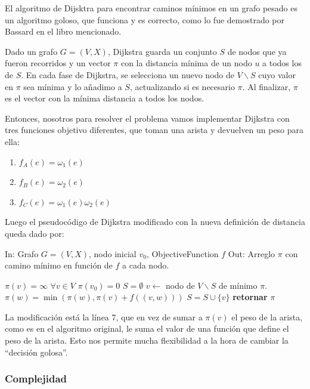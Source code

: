 El algoritmo de Dijsktra para encontrar caminos m\'inimos en un grafo pesado es un algoritmo goloso, que funciona y es correcto, como lo fue demostrado por Bassard en el libro mencionado.

Dado un grafo $G=(V,X)$, Dijkstra guarda un conjunto $S$ de nodos que ya fueron recorridos y un vector $\pi$ con la distancia m\'inima de un nodo $u$ a todos los de $S$. En cada fase de Dijkstra, se selecciona un nuevo nodo de $V\backslash S$ cuyo valor en $\pi$ sea m\'inima y lo a\~nadimo a $S$, actualizando si es necesario $\pi$. Al finalizar, $\pi$ es el vector con la m\'inima distancia a todos los nodos. 

Entonces, nosotros para resolver el problema vamos implementar Dijkstra con tres funciones objetivo diferentes, que toman una arista y devuelven un peso para ella: 

\begin{enumerate}
  \item $f_A(e) = \omega_1(e)$
  \item $f_B(e) = \omega_2(e)$
  \item $f_C(e) = \omega_1(e)\omega_2(e)$
\end{enumerate}

Luego el pseudoc\'odigo de Dijkstra modificado con la nueva definici\'on de distancia queda dado por: 

\begin{algorithm}
In: Grafo $G = (V,X)$, nodo inicial $v_0$, ObjectiveFunction $f$ \newline
Out: Arreglo $\pi$ con camino m\'inimo en funci\'on de $f$ a cada nodo. 
\begin{algorithmic}[1]
\State $\pi(v) = \infty$ \quad $\forall v \in V$
\State $\pi(v_0) = 0$
\State $S = \emptyset$
    \State $v \leftarrow $ nodo de $V\backslash S$ de m\'inimo $\pi$. 
      \State $\pi(w) = \min( \pi(w), \pi(v) + f((v,w)))$
    \EndFor
    \State $S = S \cup \{v\}$
\EndFor
\State \textbf{retornar} $\pi$
\end{algorithmic}
\end{algorithm}

La modificaci\'on est\'a la l\'inea 7, que en vez de sumar a $\pi(v)$ el peso de la arista, como es en el algoritmo original, le suma el valor de una funci\'on que define el peso de la arista. Esto nos permite mucha flexibilidad a la hora de cambiar la ``decisi\'on golosa''.

\subsubsection{Complejidad}

